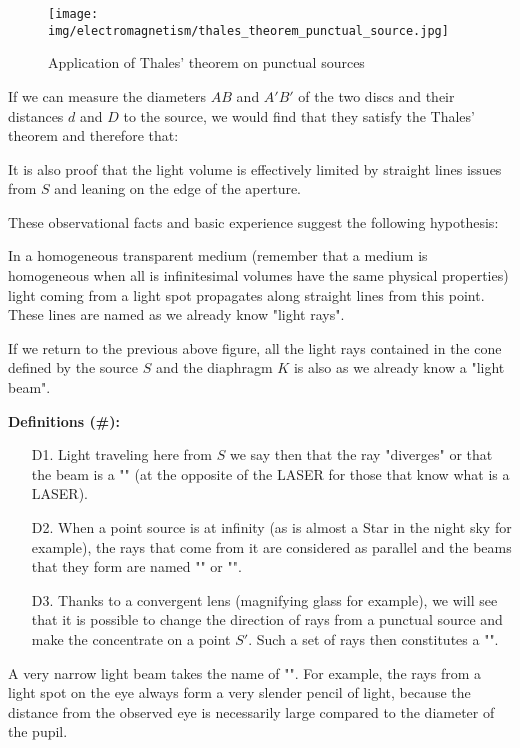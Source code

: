 	\begin{figure}[H]
		\centering
		\texttt{[image: img/electromagnetism/thales\_theorem\_punctual\_source.jpg]}
		\caption{Application of Thales' theorem on punctual sources}
	\end{figure}
	If we can measure the diameters $AB$ and $A'B'$ of the two discs and their distances $d$ and $D$ to the source, we would find that they satisfy the Thales' theorem and therefore that:
	
	It is also proof that the light volume is effectively limited by straight lines issues from $S$ and leaning on the edge of the aperture.
	
	These observational facts and basic experience suggest the following hypothesis: 
	
	In a homogeneous transparent medium (remember that a medium is homogeneous when all is infinitesimal volumes have the same physical properties) light coming from a light spot propagates along straight lines from this point. These lines are named as we already know "light rays".
	
	If we return to the previous above figure, all the light rays contained in the cone defined by the source $S$ and the diaphragm $K$ is also as we already know a "light beam".
	
	\textbf{Definitions (\#\mydef):}
	\begin{enumerate}
		\item[D1.] Light traveling here from $S$ we say then that the ray "diverges" or that the beam is a "" (at the opposite of the LASER for those that know what is a LASER).
		
		\item[D2.] When a point source is at infinity (as is almost a Star in the night sky for example), the rays that come from it are considered as parallel and the beams that they form are named "" or "".
		
		\item[D3.] Thanks to a convergent lens (magnifying glass for example), we will see that it is possible to change the direction of rays from a punctual source and make the concentrate on a point $S'$. Such a set of rays then constitutes a "".
	\end{enumerate}
	
	A very narrow light beam takes the name of "". For example, the rays from a light spot on the eye always form a very slender pencil of light, because the distance from the observed eye is necessarily large compared to the diameter of the pupil.
	
